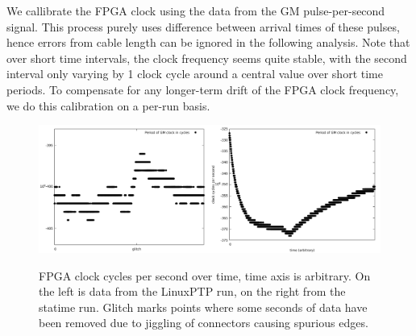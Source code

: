 \documentclass{article}
\begin{document}
We callibrate the FPGA clock using the data from the GM pulse-per-second signal. This process purely uses difference between arrival times of these pulses, hence errors from cable length can be ignored in the following analysis. Note that over short time intervals, the clock frequency seems quite stable, with the second interval only varying by 1 clock cycle around a central value over short time periods. To compensate for any longer-term drift of the FPGA clock frequency, we do this calibration on a per-run basis.

\begin{figure}[h]
\includegraphics[width=0.5\textwidth]{gm_clocks_overtime_ref.pdf}\includegraphics[width=0.5\textwidth]{gm_clocks_overtime_statime.pdf}
\caption{FPGA clock cycles per second over time, time axis is arbitrary. On the left is data from the LinuxPTP run, on the right from the statime run. Glitch marks points where some seconds of data have been removed due to jiggling of connectors causing spurious edges.}
\label{fig:gm_cycles_over_time}
\end{figure}
\end{document}
